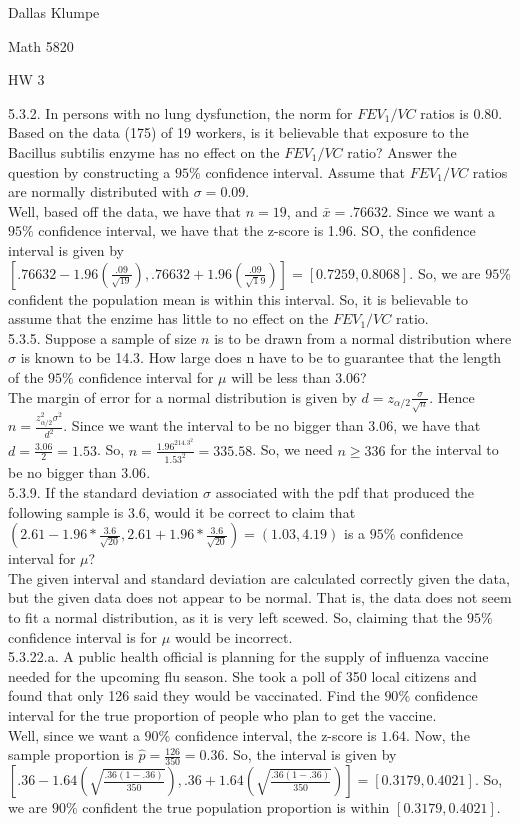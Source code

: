 \documentclass[12pt]{article}
\begin{document}
\noindent Dallas Klumpe

\noindent Math 5820

\noindent HW 3

5.3.2. In persons with no lung dysfunction, the norm for $FEV_1/VC$ ratios is 0.80. Based on the data (175) of 19 workers, is it believable that exposure to the Bacillus subtilis enzyme has no effect on the $FEV_1/VC$ ratio? Answer the question by constructing a $95\%$ confidence interval. Assume that $FEV_1/VC$ ratios are normally distributed with $\sigma=0.09$.\\
Well, based off the data, we have that $n=19$, and $\bar{x}=.76632$. Since we want a $95\%$ confidence interval, we have that the z-score is 1.96. SO, the confidence interval is given by $[.76632-1.96(\frac{.09}{\sqrt{19}}),.76632+1.96(\frac{.09}{\sqrt19})]=[0.7259,0.8068]$. So, we are $95\%$ confident the population mean is within this interval. So, it is believable to assume that the enzime has little to no effect on the $FEV_1/VC$ ratio.\\[20pt]

5.3.5. Suppose a sample of size $n$ is to be drawn from a normal distribution where $\sigma$ is known to be 14.3. How large does n have to be to guarantee that the length of the $95\%$ confidence interval for $\mu$ will be less than 3.06?\\
The margin of error for a normal distribution is given by $d=z_{\alpha/2}\frac{\sigma}{\sqrt{n}}$. Hence $n=\frac{z_{\alpha/2}^2\sigma^2}{d^2}$. Since we want the interval to be no bigger than $3.06$, we have that $d=\frac{3.06}{2}=1.53$. So, $n=\frac{1.96^214.3^2}{1.53^2}=335.58$. So, we need $n\geq336$ for the interval to be no bigger than $3.06$.\\[20pt]

5.3.9. If the standard deviation $\sigma$ associated with the pdf that produced the following sample is 3.6, would it be correct to claim that $(2.61-1.96*\frac{3.6}{\sqrt{20}},2.61+1.96*\frac{3.6}{\sqrt{20}})=(1.03, 4.19)$ is a $95\%$ confidence interval for $\mu$?\\
The given interval and standard deviation are calculated correctly given the data, but the given data does not appear to be normal. That is, the data does not seem to fit a normal distribution, as it is very left scewed. So, claiming that the $95\%$ confidence interval is for $\mu$ would be incorrect.\\[20pt]

5.3.22.a. A public health official is planning for the supply of influenza vaccine needed for the upcoming flu season. She took a poll of 350 local citizens and found that only 126 said they would be vaccinated. Find the $90\%$ confidence interval for the true proportion of people who plan to get the vaccine.\\
Well, since we want a $90\%$ confidence interval, the z-score is $1.64$. Now, the sample proportion is $\hat{p}=\frac{126}{350}=0.36$. So, the interval is given by $[.36-1.64(\sqrt{\frac{.36(1-.36)}{350}}), .36+1.64(\sqrt{\frac{.36(1-.36)}{350}})]=[0.3179, 0.4021]$. So, we are $90\%$ confident the true population proportion is within $[0.3179, 0.4021]$.\\
\end{document}
